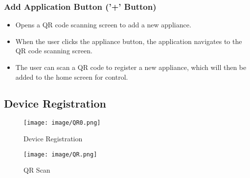 \documentclass[conference]{IEEEtran}
\begin{document}
\subsubsection{Add Application Button ('+' Button)}
\begin{itemize}
    \item Opens a QR code scanning screen to add a new appliance.\\
    \item When the user clicks the appliance button, the application navigates to the QR code scanning screen.\\
    \item The user can scan a QR code to register a new appliance, which will then be added to the home screen for control.\\
\end{itemize}

\vspace{2cm}

\subsection{Device Registration}

\begin{figure}[h!]
    \centering
    \texttt{[image: image/QR0.png]}
    \caption{Device Registration}
    \label{fig:enter-label}
\end{figure}
\begin{figure}[h!]
    \centering
    \texttt{[image: image/QR.png]}
    \caption{QR Scan}
    \label{fig:enter-label}
\end{figure}
\end{document}
